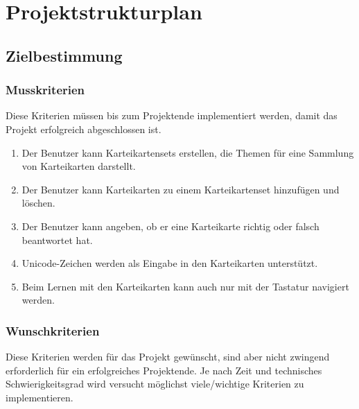 \section{Projektstrukturplan}

\subsection{Zielbestimmung}
\subsubsection{Musskriterien}
Diese Kriterien müssen bis zum Projektende implementiert werden, damit das Projekt erfolgreich abgeschlossen ist.

\begin{enumerate}[leftmargin=2cm, label=\bfseries /MK\arabic*0/]
	\item Der Benutzer kann Karteikartensets erstellen, die Themen für eine Sammlung von Karteikarten darstellt.
	\item Der Benutzer kann Karteikarten zu einem Karteikartenset hinzufügen und löschen.
	\item Der Benutzer kann angeben, ob er eine Karteikarte richtig oder falsch beantwortet hat.
	\item\label{unicode} Unicode-Zeichen werden als Eingabe in den Karteikarten unterstützt.
	\item\label{keyboard} Beim Lernen mit den Karteikarten kann auch nur mit der Tastatur navigiert werden.
\end{enumerate}


\subsubsection{Wunschkriterien}
Diese Kriterien werden für das Projekt gewünscht, sind aber nicht zwingend erforderlich für ein erfolgreiches Projektende. Je nach Zeit und technisches Schwierigkeitsgrad wird versucht möglichst viele/wichtige Kriterien zu implementieren.

